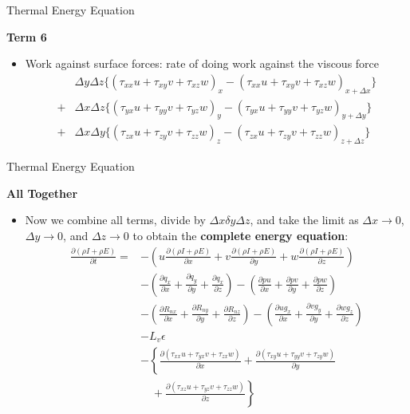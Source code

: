 \begin{frame}{Thermal Energy Equation}

\textbf{Term 6}
\begin{itemize}
	\item Work against surface forces: rate of doing work against the viscous force
	\begin{align*}
		&\Delta y\Delta z \{ (\tau_{xx}u + \tau_{xy}v + \tau_{xz} w)_{x} - (\tau_{xx}u + \tau_{xy}v + \tau_{xz} w)_{x+\Delta x}\}\\
		+&\Delta x\Delta z \{ (\tau_{yx}u + \tau_{yy}v + \tau_{yz} w)_{y} - (\tau_{yx}u + \tau_{yy}v + \tau_{yz} w)_{y+\Delta y}\}\\
		+&\Delta x\Delta y \{ (\tau_{zx}u + \tau_{zy}v + \tau_{zz} w)_{z} - (\tau_{zx}u + \tau_{zy}v + \tau_{zz} w)_{z+\Delta z}\}
	\end{align*}
\end{itemize}
\end{frame}
\begin{frame}{Thermal Energy Equation}

\textbf{All Together}
\begin{itemize}
	\item Now we combine all terms, divide by $\Delta x \delta y \Delta z$, and take the limit as $\Delta x \rightarrow 0$, $\Delta y \rightarrow 0$, and $\Delta z \rightarrow 0$ to obtain the \textbf{complete energy equation}:
	\small
	\begin{align*}
		\frac{\partial (\rho I + \rho E)}{\partial t} = &-\left(u\frac{\partial (\rho I + \rho E)}{\partial x} + v\frac{\partial (\rho I + \rho E)}{\partial y} + w\frac{\partial (\rho I + \rho E)}{\partial z}\right)\\
		&-\left(\frac{\partial q_x}{\partial x} + \frac{\partial q_y}{\partial y} + \frac{\partial q_x}{\partial z}\right)-\left(\frac{\partial pu}{\partial x} + \frac{\partial pv}{\partial y} + \frac{\partial pw}{\partial z}\right)\\
		&-\left(\frac{\partial R_{nx}}{\partial x} + \frac{\partial R_{ny}}{\partial y} + \frac{\partial R_{nz}}{\partial z}\right) -\left(\frac{\partial ug_x}{\partial x} + \frac{\partial vg_y}{\partial y} + \frac{\partial wg_z}{\partial z}\right)\\
		&- L_v\epsilon \\
		&-\left\{\frac{\partial (\tau_{xx} u + \tau_{yx} v + \tau_{zx} w)}{\partial x}+\frac{\partial (\tau_{xy} u + \tau_{yy} v + \tau_{zy} w)}{\partial y} \right. \\ &\quad+  \left. \frac{\partial (\tau_{xz} u + \tau_{yz} v + \tau_{zz} w)}{\partial z} \right\}
	\end{align*}
\end{itemize}
\end{frame}
